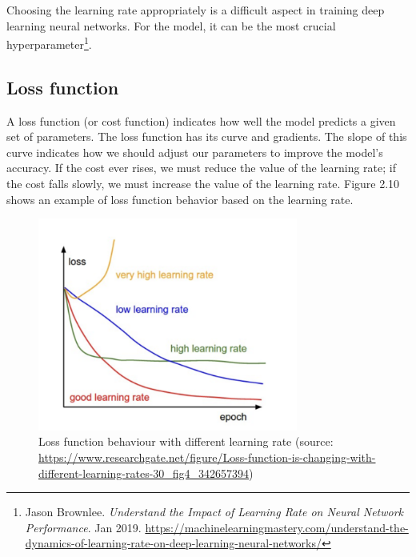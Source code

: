 Choosing the learning rate appropriately is a difficult aspect in training deep learning neural networks. For the model, it can be the most crucial hyperparameter\footnote{Jason Brownlee. \textit{Understand the Impact of Learning Rate on Neural Network Performance}. Jan 2019. \url{https://machinelearningmastery.com/understand-the-dynamics-of-learning-rate-on-deep-learning-neural-networks/}}.

\newpage
\subsection{Loss function}
\label{subsec:loss_function}
\hspace{0.5cm}A loss function (or cost function) indicates how well the model predicts a given set of parameters. The loss function has its curve and gradients. The slope of this curve indicates how we should adjust our parameters to improve the model's accuracy. If the cost ever rises, we must reduce the value of the learning rate; if the cost falls slowly, we must increase the value of the learning rate. Figure 2.10 shows an example of loss function behavior based on the learning rate.
\begin{figure}[!h]
	\centering
	\includegraphics[width=\linewidth, height=7cm,keepaspectratio]{figures/loss function DL.png}
   \caption{Loss function behaviour with different learning rate (source: \url{https://www.researchgate.net/figure/Loss-function-is-changing-with-different-learning-rates-30_fig4_342657394})}
\end{figure}

